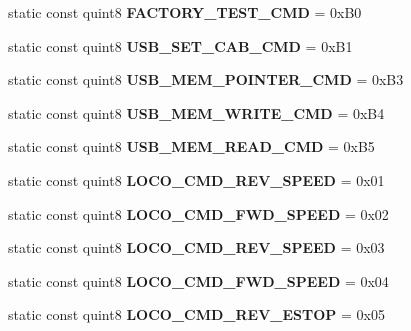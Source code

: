 \begin{DoxyCompactItemize}
static const quint8 {\bfseries F\+A\+C\+T\+O\+R\+Y\+\_\+\+T\+E\+S\+T\+\_\+\+C\+MD} = 0x\+B0
\item 
\mbox{\label{class_n_c_e_message_a918dcc9275ac42f4c332b5daec3ade41}} 
static const quint8 {\bfseries U\+S\+B\+\_\+\+S\+E\+T\+\_\+\+C\+A\+B\+\_\+\+C\+MD} = 0x\+B1
\item 
\mbox{\label{class_n_c_e_message_a2973406210a824247d98bf54308d748c}} 
static const quint8 {\bfseries U\+S\+B\+\_\+\+M\+E\+M\+\_\+\+P\+O\+I\+N\+T\+E\+R\+\_\+\+C\+MD} = 0x\+B3
\item 
\mbox{\label{class_n_c_e_message_a386295827d3e09e4a40b14b87663f730}} 
static const quint8 {\bfseries U\+S\+B\+\_\+\+M\+E\+M\+\_\+\+W\+R\+I\+T\+E\+\_\+\+C\+MD} = 0x\+B4
\item 
\mbox{\label{class_n_c_e_message_ae29408a74fb88d81353e2053a2bb9190}} 
static const quint8 {\bfseries U\+S\+B\+\_\+\+M\+E\+M\+\_\+\+R\+E\+A\+D\+\_\+\+C\+MD} = 0x\+B5
\item 
\mbox{\label{class_n_c_e_message_a5c49c45dca14707909b6bb57630e339c}} 
static const quint8 {\bfseries L\+O\+C\+O\+\_\+\+C\+M\+D\+\_\+\+R\+E\+V\+\_\+S\+P\+E\+ED} = 0x01
\item 
\mbox{\label{class_n_c_e_message_aeee6d4d067650d1c768d5a07a27dd212}} 
static const quint8 {\bfseries L\+O\+C\+O\+\_\+\+C\+M\+D\+\_\+\+F\+W\+D\+\_\+S\+P\+E\+ED} = 0x02
\item 
\mbox{\label{class_n_c_e_message_a7dfc478217a861484383524fb5b0f780}} 
static const quint8 {\bfseries L\+O\+C\+O\+\_\+\+C\+M\+D\+\_\+\+R\+E\+V\+\_\+S\+P\+E\+ED} = 0x03
\item 
\mbox{\label{class_n_c_e_message_a65931244e5e08eab994637b84ee5e3f7}} 
static const quint8 {\bfseries L\+O\+C\+O\+\_\+\+C\+M\+D\+\_\+\+F\+W\+D\+\_\+S\+P\+E\+ED} = 0x04
\item 
\mbox{\label{class_n_c_e_message_aa97de2743e72bfb35b7116fd6a481ebe}} 
static const quint8 {\bfseries L\+O\+C\+O\+\_\+\+C\+M\+D\+\_\+\+R\+E\+V\+\_\+\+E\+S\+T\+OP} = 0x05

\end{DoxyCompactItemize}
